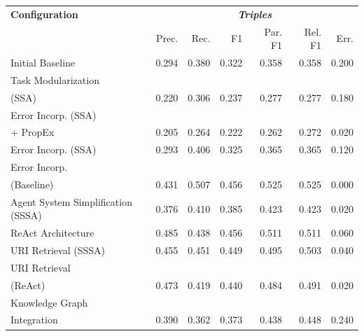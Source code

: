 \documentclass[a4paper,oneside,bibliography=totoc]{scrbook}
\begin{document}
\begin{table}[h]
  \centering
  \begin{tabular}{p{5cm}|rrrrrr}
    \toprule
    \textbf{Configuration}             & \multicolumn{6}{c}{\textit{\textbf{Triples}}}                                             \\
                                       & Prec.                                         & Rec.  & F1    & Par. F1 & Rel. F1 & Err.  \\
    \midrule
    Initial Baseline                   & 0.294                                         & 0.380 & 0.322 & 0.358   & 0.358   & 0.200 \\
    Task Modularization                                                                                                            \\(SSA) & 0.220 & 0.306 & 0.237 & 0.277 & 0.277 & 0.180 \\
    Error Incorp. (SSA)                                                                                                            \\ + PropEx & 0.205 & 0.264 & 0.222 & 0.262 & 0.272 & 0.020 \\
    Error Incorp. (SSA)                & 0.293                                         & 0.406 & 0.325 & 0.365   & 0.365   & 0.120 \\
    Error Incorp.                                                                                                                  \\(Baseline) & 0.431 & 0.507 & 0.456 & 0.525 & 0.525 & 0.000 \\
    Agent System Simplification (SSSA) & 0.376                                         & 0.410 & 0.385 & 0.423   & 0.423   & 0.020 \\
    ReAct Architecture                 & 0.485                                         & 0.438 & 0.456 & 0.511   & 0.511   & 0.060 \\
    URI Retrieval (SSSA)               & 0.455                                         & 0.451 & 0.449 & 0.495   & 0.503   & 0.040 \\
    URI Retrieval                                                                                                                  \\(ReAct) & 0.473 & 0.419 & 0.440 & 0.484 & 0.491 & 0.020 \\
    Knowledge Graph                                                                                                                \\Integration & 0.390 & 0.362 & 0.373 & 0.438 & 0.448 & 0.240 \\

\end{tabular}
\end{table}
\end{document}
